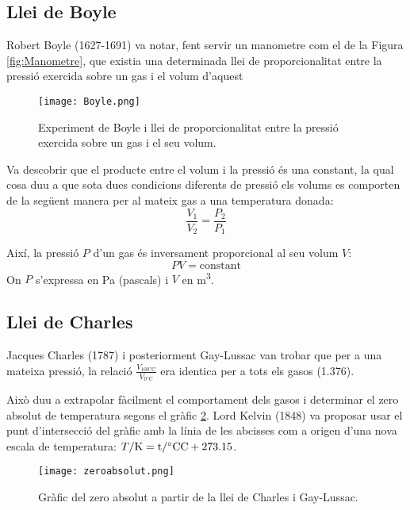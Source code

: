 \subsection{Llei de Boyle}

Robert Boyle (1627-1691) va notar, fent servir un manometre com el de la Figura \ref{fig:Manometre}, que existia una determinada llei de proporcionalitat entre la pressió exercida sobre un gas i el volum d'aquest
\begin{figure}[h]
\centering
\texttt{[image: Boyle.png]}
\caption{Experiment de Boyle i llei de proporcionalitat entre la pressió exercida sobre un gas i el seu volum.}
\label{fig:Boyle}
\end{figure}
Va descobrir que el producte entre el volum i la pressió és una constant, la qual cosa duu a que sota dues condicions diferents de pressió els volums es comporten de la següent manera per al mateix gas a una temperatura donada:
\[
\frac{V_1}{V_2}=\frac{P_2}{P_1}
\]

Així, la pressió \( P \) d'un gas és inversament proporcional al seu volum \( V \):
\begin{equation}
    P V = \text{constant}
\end{equation}
On \( P \) s'expressa en \si{Pa} (pascals) i \( V \) en \si{m^3}.

\subsection{Llei de Charles}

Jacques Charles (1787) i posteriorment Gay-Lussac van trobar que per a una mateixa pressió, la relació $\frac{V_{100 \si\degreeCelsius}}{V_{0 \si\degreeCelsius}}$ era identica per a tots els gasos (1.376).

Això duu a extrapolar fàcilment el comportament dels gasos i determinar el zero absolut de temperatura segons el gràfic \ref{fig:zeroabsolut}. Lord Kelvin (1848) va proposar usar el punt d'intersecció del gràfic amb la línia de les abcisses com a origen d'una nova escala de temperatura: $T/\rm{K} = t/\si\degreeCelsius \rm{C} + 273.15$.
\begin{figure}[h]
\centering
\texttt{[image: zeroabsolut.png]}
\caption{Gràfic del zero absolut a partir de la llei de Charles i Gay-Lussac.}
\label{fig:zeroabsolut}
\end{figure}

